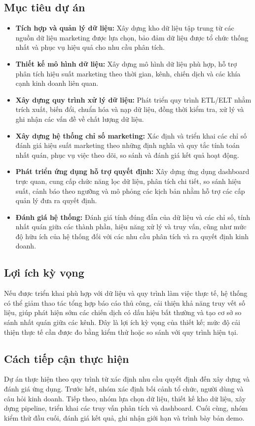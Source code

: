 \subsection{Mục tiêu dự án}

\begin{itemize}
  \item \textbf{Tích hợp và quản lý dữ liệu:} Xây dựng kho dữ liệu tập trung từ các nguồn dữ liệu marketing được lựa chọn, bảo đảm dữ liệu được tổ chức thống nhất và phục vụ hiệu quả cho nhu cầu phân tích.
  \item \textbf{Thiết kế mô hình dữ liệu:} Xây dựng mô hình dữ liệu phù hợp, hỗ trợ phân tích hiệu suất marketing theo thời gian, kênh, chiến dịch và các khía cạnh kinh doanh liên quan.
  \item \textbf{Xây dựng quy trình xử lý dữ liệu:} Phát triển quy trình ETL/ELT nhằm trích xuất, biến đổi, chuẩn hóa và nạp dữ liệu, đồng thời kiểm tra, xử lý và ghi nhận các vấn đề về chất lượng dữ liệu.
  \item \textbf{Xây dựng hệ thống chỉ số marketing:} Xác định và triển khai các chỉ số đánh giá hiệu suất marketing theo những định nghĩa và quy tắc tính toán nhất quán, phục vụ việc theo dõi, so sánh và đánh giá kết quả hoạt động.
  \item \textbf{Phát triển ứng dụng hỗ trợ quyết định:} Xây dựng ứng dụng dashboard trực quan, cung cấp chức năng lọc dữ liệu, phân tích chi tiết, so sánh hiệu suất, cảnh báo theo ngưỡng và mô phỏng các kịch bản nhằm hỗ trợ các cấp quản lý đưa ra quyết định.
  \item \textbf{Đánh giá hệ thống:} Đánh giá tính đúng đắn của dữ liệu và các chỉ số, tính nhất quán giữa các thành phần, hiệu năng xử lý và truy vấn, cũng như mức độ hữu ích của hệ thống đối với các nhu cầu phân tích và ra quyết định kinh doanh.
\end{itemize}

\subsection{Lợi ích kỳ vọng}
Nếu được triển khai phù hợp với dữ liệu và quy trình làm việc thực tế, hệ thống có thể giảm thao tác tổng hợp báo cáo thủ công, cải thiện khả năng truy vết số liệu, giúp phát hiện sớm các chiến dịch có dấu hiệu bất thường và tạo cơ sở so sánh nhất quán giữa các kênh. Đây là lợi ích kỳ vọng của thiết kế; mức độ cải thiện thực tế cần được đo bằng kiểm thử hoặc so sánh với quy trình hiện tại.

\subsection{Cách tiếp cận thực hiện}
Dự án thực hiện theo quy trình từ xác định nhu cầu quyết định đến xây dựng và đánh giá ứng dụng. Trước hết, nhóm xác định bối cảnh tổ chức, người dùng và câu hỏi kinh doanh. Tiếp theo, nhóm lựa chọn dữ liệu, thiết kế kho dữ liệu, xây dựng pipeline, triển khai các truy vấn phân tích và dashboard. Cuối cùng, nhóm kiểm thử đầu cuối, đánh giá kết quả, ghi nhận giới hạn và trình bày bản demo.